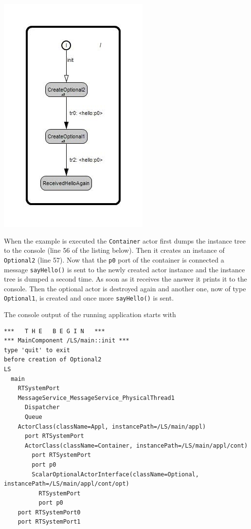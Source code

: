 \includegraphics[scale=0.7]{images/039-DynAct1-Container_behavior.jpg}

When the example is executed the \texttt{Container} actor first dumps the instance tree to the console
(line 56 of the listing below).
Then it creates an instance of \texttt{Optional2} (line 57). Now that the \texttt{p0} port
of the container is connected a message \texttt{sayHello()} is sent to the newly created actor instance
and the instance tree is dumped a second time.
As soon as it receives the answer it prints it to the console. Then the optional actor is destroyed again
and another one, now of type \texttt{Optional1}, is created and once more \texttt{sayHello()} is sent.



The console output of the running application starts with

\begin{verbatim}
***   T H E   B E G I N   ***
*** MainComponent /LS/main::init ***
type 'quit' to exit
before creation of Optional2
LS
  main
    RTSystemPort
    MessageService_MessageService_PhysicalThread1
      Dispatcher
      Queue
    ActorClass(className=Appl, instancePath=/LS/main/appl)
      port RTSystemPort
      ActorClass(className=Container, instancePath=/LS/main/appl/cont)
        port RTSystemPort
        port p0
        ScalarOptionalActorInterface(className=Optional, instancePath=/LS/main/appl/cont/opt)
          RTSystemPort
          port p0
    port RTSystemPort0
    port RTSystemPort1
\end{verbatim}

